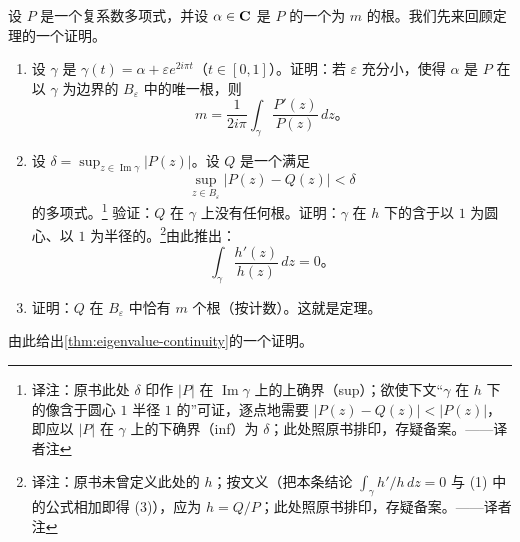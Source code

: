 \begin{exercise}\label{ex:ch14-043-rouche-eigenvalue-continuity}
设 $P$ 是一个复系数多项式，并设 $\alpha\in\mathbf{C}$ 是 $P$ 的一个\trMultiplicity{}为 $m$ 的根。我们先来回顾\trRouche{}定理的一个证明。

\begin{enumerate}[label=(\arabic*)]
\item 设 $\gamma$ 是\trCircle{} $\gamma(t)=\alpha+\varepsilon e^{2i\pi t}$（$t\in[0,1]$）。证明：若 $\varepsilon$ 充分小，使得 $\alpha$ 是 $P$ 在以 $\gamma$ 为边界的\trClosed\trDisk{} $B_\varepsilon$ 中的唯一根，则
\[
m=\frac{1}{2i\pi}\int_{\gamma}\frac{P'(z)}{P(z)}\,dz\text{。}
\]
\item 设 $\delta=\sup_{z\in\operatorname{Im}\gamma}|P(z)|$。设 $Q$ 是一个满足
\[
\sup_{z\in B_\varepsilon}\bigl|P(z)-Q(z)\bigr|<\delta
\]
的多项式。\footnote{译注：原书此处 $\delta$ 印作 $|P|$ 在 $\operatorname{Im}\gamma$ 上的上确界（sup）；欲使下文“$\gamma$ 在 $h$ 下的像含于圆心 $1$ 半径 $1$ 的\trOpen{}\trDisk”可证，逐点地需要 $|P(z)-Q(z)|<|P(z)|$，即应以 $|P|$ 在 $\gamma$ 上的下确界（inf）为 $\delta$；此处照原书排印，存疑备案。——译者注}
验证：$Q$ 在\trCircle{} $\gamma$ 上没有任何根。证明：$\gamma$ 在 $h$ 下的\trImage{}含于以 $1$ 为圆心、以 $1$ 为半径的\trOpen{}\trDisk。\footnote{译注：原书未曾定义此处的 $h$；按文义（把本条结论 $\int_{\gamma}h'/h\,dz=0$ 与 (1) 中的公式相加即得 (3)），应为 $h=Q/P$；此处照原书排印，存疑备案。——译者注}由此推出：
\[
\int_{\gamma}\frac{h'(z)}{h(z)}\,dz=0\text{。}
\]
\item 证明：$Q$ 在\trDisk{} $B_\varepsilon$ 中恰有 $m$ 个根（按\trMultiplicity{}计数）。这就是\trRouche{}定理。
\end{enumerate}
由此给出\cref{thm:eigenvalue-continuity}的一个证明。
\end{exercise}
